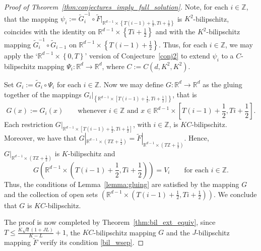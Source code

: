 \documentclass[a4paper, bibliography=totoc]{scrartcl}
\numberwithin{claimcounter}{define}
\newcommand{\R}{\mathbb{R}}
\newcommand{\Z}{\mathbb{Z}}
\newcommand{\set}[1]{\left\{#1\right\}}
\newcommand{\br}[1]{\left(#1\right)}
\newcommand{\sqbr}[1]{\left[#1\right]}
\newcommand{\wt}[1]{\widetilde{#1}}
\begin{document}
\begin{proof}[Proof of Theorem~\ref{thm:conjectures_imply_full_solution}]
	Note, for each $i\in\Z$, that the mapping $\psi_{i}:=\wt{G}_{i}^{-1}\circ \wt{F}|_{\R^{d-1}\times\set{T(i-1)+\frac{1}{2},Ti+\frac{1}{2}}}$ is $K^{2}$-bilipschitz, coincides with the identity on $\R^{d-1}\times\set{Ti+\frac{1}{2}}$ and with the $K^{2}$-bilipschitz mapping $\wt{G}_{i}^{-1}\circ \wt{G}_{i-1}$ on $\R^{d-1}\times\set{T(i-1)+\frac{1}{2}}$. Thus, for each $i\in\Z$, we may apply the `$\R^{d-1}\times\set{0,T}$' version of Conjecture~\ref{conj2} to extend $\psi_{i}$ to a $C$-bilipschitz mapping $\Psi_{i}\colon \R^{d}\to\R^{d}$, where $C:=C(d,K^{2},K^{2})$.
	
	Set $G_{i}:=\wt{G}_{i}\circ \Psi_{i}$ for each $i\in\Z$. Now we may define $G\colon \R^{d}\to\R^{d}$ as the gluing together of the mappings $G_{i}|_{\set{\R^{d-1}\times\sqbr{T(i-1)+\frac{1}{2},Ti+\frac{1}{2}}}}$, that is
	\begin{equation*}
	G(x):=G_{i}(x)\qquad \text{whenever }i\in\Z\text{ and }x\in \R^{d-1}\times\sqbr{T(i-1)+\frac{1}{2},Ti+\frac{1}{2}}.
	\end{equation*}
	Each restriction $G|_{\R^{d-1}\times\sqbr{T(i-1)+\frac{1}{2},Ti+\frac{1}{2}}}$, with $i\in\Z$, is $KC$-bilipschitz. Moreover, we have that $G|_{\R^{d-1}\times\br{T\Z+\frac{1}{2}}}=\wt{F}|_{\R^{d-1}\times \br{T\Z+\frac{1}{2}}}$. Hence, $G|_{\R^{d-1}\times\br{T\Z+\frac{1}{2}}}$ is $K$-bilipschitz and 
	\begin{equation*}
	G\br{\R^{d-1}\times\br{T(i-1)+\frac{1}{2},Ti+\frac{1}{2}}}=V_{i}\qquad \text{for each }i\in\Z.
	\end{equation*}
	Thus, the conditions of Lemma~\ref{lemma:gluing} are satisfied by the mapping $G$ and the collection of open sets $\br{\R^{d-1}\times\br{T(i-1)+\frac{1}{2},Ti+\frac{1}{2}}}$. We conclude that $G$ is $KC$-bilipschitz.
	
	The proof is now completed by Theorem~\ref{thm:bil_ext_equiv}, since $T\leq \frac{K\sqrt{d}(1+JL)}{K-L}+1$, the $KC$-bilipschitz mapping $G$ and the $J$-bilipschitz mapping $\wt{F}$ verify its condition \eqref{bil_wsep}.	
\end{proof}



\end{document}
